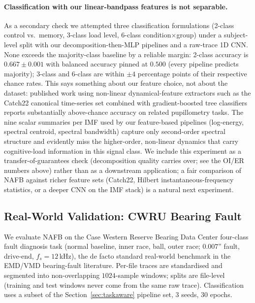 \documentclass[journal]{IEEEtran}
\theoremstyle{remark}
\begin{document}
\paragraph{Classification with our linear-bandpass features is not separable.}
As a secondary check we attempted three classification formulations
(2-class control vs.\ memory, 3-class load level, 6-class
condition$\times$group) under a subject-level split with our
decomposition-then-MLP pipelines and a raw-trace 1D CNN. None exceeds
the majority-class baseline by a reliable margin: 2-class accuracy is
$0.667 \pm 0.001$ with balanced accuracy pinned at $0.500$ (every
pipeline predicts majority); 3-class and 6-class are within $\pm 4$
percentage points of their respective chance rates. This says
something about our feature choice, not about the dataset: published
work using non-linear dynamical-feature extractors such as the
Catch22 canonical time-series set combined with gradient-boosted tree
classifiers reports substantially above-chance accuracy on related
pupillometry tasks. The nine scalar summaries per IMF used by our
feature-based pipelines (log-energy, spectral centroid, spectral
bandwidth) capture only second-order spectral structure and
evidently miss the higher-order, non-linear dynamics that carry
cognitive-load information in this signal class. We include this
experiment as a transfer-of-guarantees check (decomposition quality
carries over; see the OI/ER numbers above) rather than as a
downstream application; a fair comparison of NAFB against richer
feature sets (Catch22, Hilbert instantaneous-frequency statistics,
or a deeper CNN on the IMF stack) is a natural next experiment.

\subsection{Real-World Validation: CWRU Bearing Fault}
\label{subsec:cwru}

We evaluate NAFB on the Case Western Reserve Bearing Data Center
four-class fault diagnosis task (normal baseline, inner race, ball,
outer race; $0.007$'' fault, drive-end, $f_{s} = 12$\,kHz), the de
facto standard real-world benchmark in the EMD/VMD bearing-fault
literature. Per-file traces are standardised and segmented into
non-overlapping $1024$-sample windows; splits are file-level (training
and test windows never come from the same raw trace). Classification
uses a subset of the Section~\ref{sec:taskaware} pipeline set, $3$
seeds, $30$ epochs.
\end{document}
